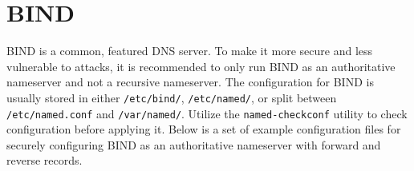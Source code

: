 \section{BIND}

BIND is a common, featured DNS server. To make it more secure and less vulnerable to attacks, it is recommended to only run BIND as an authoritative nameserver and not a recursive nameserver. The configuration for BIND is usually stored in either \lstinline|/etc/bind/|, \lstinline|/etc/named/|, or split between \lstinline|/etc/named.conf| and \lstinline|/var/named/|. Utilize the \lstinline|named-checkconf| utility to check configuration before applying it. Below is a set of example configuration files for securely configuring BIND as an authoritative nameserver with forward and reverse records.




